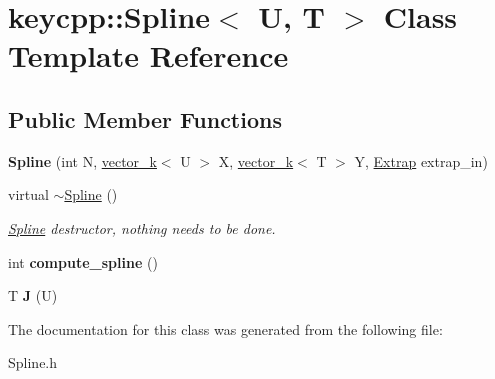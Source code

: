 \hypertarget{classkeycpp_1_1_spline}{\section{keycpp\-:\-:Spline$<$ U, T $>$ Class Template Reference}
\label{classkeycpp_1_1_spline}
}
\subsection*{Public Member Functions}
\begin{DoxyCompactItemize}
\item 
\hypertarget{classkeycpp_1_1_spline_a4a5f709dc92fefe7e0799c73c80234e0}{{\bfseries Spline} (int N, \hyperlink{classkeycpp_1_1vector__k}{vector\-\_\-k}$<$ U $>$ X, \hyperlink{classkeycpp_1_1vector__k}{vector\-\_\-k}$<$ T $>$ Y, \hyperlink{classkeycpp_1_1_extrap}{Extrap} extrap\-\_\-in)}\label{classkeycpp_1_1_spline_a4a5f709dc92fefe7e0799c73c80234e0}

\item 
\hypertarget{classkeycpp_1_1_spline_a8d7aaf51fd3a1c48ed43d70b2b9c10fe}{virtual \hyperlink{classkeycpp_1_1_spline_a8d7aaf51fd3a1c48ed43d70b2b9c10fe}{$\sim$\-Spline} ()}\label{classkeycpp_1_1_spline_a8d7aaf51fd3a1c48ed43d70b2b9c10fe}

\begin{DoxyCompactList}\small\item\em \hyperlink{classkeycpp_1_1_spline}{Spline} destructor, nothing needs to be done. \end{DoxyCompactList}\item 
\hypertarget{classkeycpp_1_1_spline_afcd84822df41426f4ea9da070d97b376}{int {\bfseries compute\-\_\-spline} ()}\label{classkeycpp_1_1_spline_afcd84822df41426f4ea9da070d97b376}

\item 
\hypertarget{classkeycpp_1_1_spline_a7fa452b0c1952f0a3e4160f59195d513}{T {\bfseries J} (U)}\label{classkeycpp_1_1_spline_a7fa452b0c1952f0a3e4160f59195d513}

\end{DoxyCompactItemize}


The documentation for this class was generated from the following file\-:\begin{DoxyCompactItemize}
\item 
Spline.\-h\end{DoxyCompactItemize}
